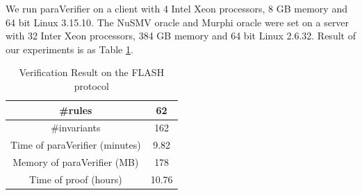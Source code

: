 \documentclass{llncs}
\begin{document}
We run {\sf paraVerifier} on a client with 4 Intel Xeon processors, 8 GB memory and 64 bit Linux 3.15.10. The NuSMV oracle and Murphi oracle were set on a server with 32 Inter Xeon processors, 384 GB memory and 64 bit Linux 2.6.32. Result of our experiments is as Table \ref{tab:flashRes}.


\begin{table}[!htbp]
  \centering
  \footnotesize
   \caption{Verification Result on the FLASH protocol}
  \label{tab:flashRes}
  \vspace{-5pt}
  \begin{tabular}{|c|c|}
    \hline
    \#rules & 62\\
    \hline
    \#invariants & 162\\
    \hline
    Time of {\sf paraVerifier} (minutes) & 9.82\\
    \hline
    Memory of {\sf paraVerifier} (MB) & 178\\
    \hline
    Time of proof (hours) & 10.76\\
    \hline
  \end{tabular}

\end{table}






\end{document}
